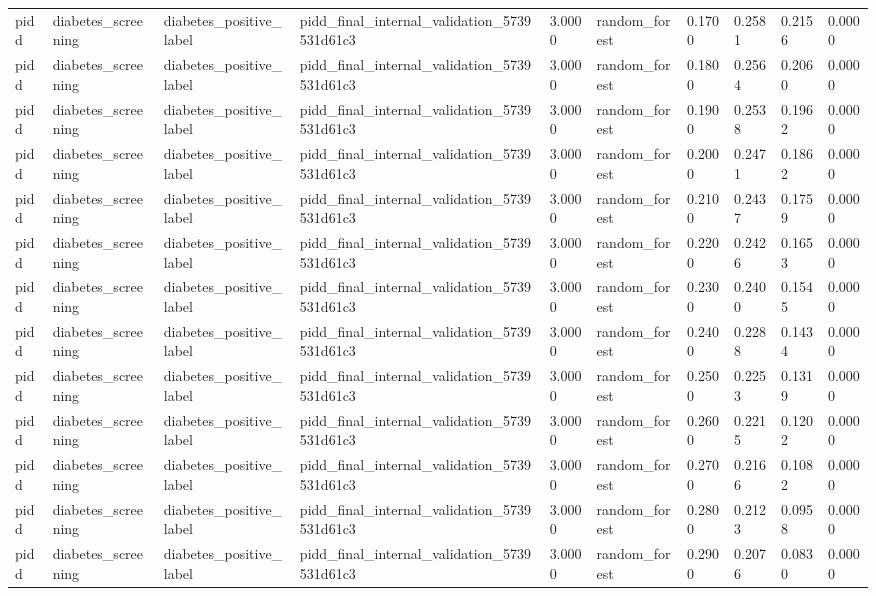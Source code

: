 \begin{tabular}{llllllllll}
pidd & diabetes\_screening & diabetes\_positive\_label & pidd\_final\_internal\_validation\_5739531d61c3 & 3.0000 & random\_forest & 0.1700 & 0.2581 & 0.2156 & 0.0000 \\
pidd & diabetes\_screening & diabetes\_positive\_label & pidd\_final\_internal\_validation\_5739531d61c3 & 3.0000 & random\_forest & 0.1800 & 0.2564 & 0.2060 & 0.0000 \\
pidd & diabetes\_screening & diabetes\_positive\_label & pidd\_final\_internal\_validation\_5739531d61c3 & 3.0000 & random\_forest & 0.1900 & 0.2538 & 0.1962 & 0.0000 \\
pidd & diabetes\_screening & diabetes\_positive\_label & pidd\_final\_internal\_validation\_5739531d61c3 & 3.0000 & random\_forest & 0.2000 & 0.2471 & 0.1862 & 0.0000 \\
pidd & diabetes\_screening & diabetes\_positive\_label & pidd\_final\_internal\_validation\_5739531d61c3 & 3.0000 & random\_forest & 0.2100 & 0.2437 & 0.1759 & 0.0000 \\
pidd & diabetes\_screening & diabetes\_positive\_label & pidd\_final\_internal\_validation\_5739531d61c3 & 3.0000 & random\_forest & 0.2200 & 0.2426 & 0.1653 & 0.0000 \\
pidd & diabetes\_screening & diabetes\_positive\_label & pidd\_final\_internal\_validation\_5739531d61c3 & 3.0000 & random\_forest & 0.2300 & 0.2400 & 0.1545 & 0.0000 \\
pidd & diabetes\_screening & diabetes\_positive\_label & pidd\_final\_internal\_validation\_5739531d61c3 & 3.0000 & random\_forest & 0.2400 & 0.2288 & 0.1434 & 0.0000 \\
pidd & diabetes\_screening & diabetes\_positive\_label & pidd\_final\_internal\_validation\_5739531d61c3 & 3.0000 & random\_forest & 0.2500 & 0.2253 & 0.1319 & 0.0000 \\
pidd & diabetes\_screening & diabetes\_positive\_label & pidd\_final\_internal\_validation\_5739531d61c3 & 3.0000 & random\_forest & 0.2600 & 0.2215 & 0.1202 & 0.0000 \\
pidd & diabetes\_screening & diabetes\_positive\_label & pidd\_final\_internal\_validation\_5739531d61c3 & 3.0000 & random\_forest & 0.2700 & 0.2166 & 0.1082 & 0.0000 \\
pidd & diabetes\_screening & diabetes\_positive\_label & pidd\_final\_internal\_validation\_5739531d61c3 & 3.0000 & random\_forest & 0.2800 & 0.2123 & 0.0958 & 0.0000 \\
pidd & diabetes\_screening & diabetes\_positive\_label & pidd\_final\_internal\_validation\_5739531d61c3 & 3.0000 & random\_forest & 0.2900 & 0.2076 & 0.0830 & 0.0000 \\

\end{tabular}

